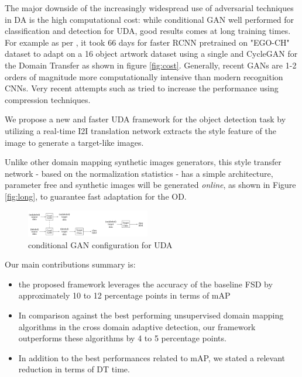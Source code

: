 \documentclass[10pt,twocolumn,letterpaper]{article}
\begin{document}
The major downside of the increasingly widespread use of adversarial techniques in DA is the high computational cost: while conditional GAN well performed for classification and detection for UDA, good results comes at long training times. For example as per \cite{pasqualino2020unsupervised}, it took 66 days for faster RCNN pretrained on "EGO-CH" dataset to adapt on a 16 object artwork dataset using a single and CycleGAN for the Domain Transfer as shown in figure \ref{fig:cost}. Generally, recent GANs are 1-2 orders of magnitude more computationally intensive than modern recognition CNNs. Very recent attempts such as \cite{li2020gan} tried to increase the performance using compression techniques.

We propose a new and faster UDA framework for the object detection task by utilizing a real-time I2I translation network extracts the style feature of the image to generate a target-like images. 

Unlike other domain mapping synthetic images generators, this style transfer network - based on the normalization statistics - has a simple architecture, parameter free and synthetic images will be generated {\it online}, as shown in Figure \ref{fig:long}, to guarantee fast adaptation for the OD.


\begin{figure} [b]
   \centering
   \includegraphics[width=0.48\textwidth]{Images/conditionalgan_syn_generation.png}
   \caption{conditional GAN configuration for UDA}
\label{fig:ConditionalGAN}
\end{figure}

Our main contributions summary is:
\begin{itemize}
    \item the proposed framework leverages the accuracy of the baseline FSD by approximately 10 to 12 percentage points in terms of mAP
    
    \vspace{15mm}
    \item In comparison against the best performing unsupervised domain mapping algorithms in the cross domain adaptive detection, our framework outperforms these algorithms by 4 to 5 percentage points.
    \item In addition to the best performances related to mAP, we stated a relevant reduction in terms of DT time.
\end{itemize}
\end{document}
